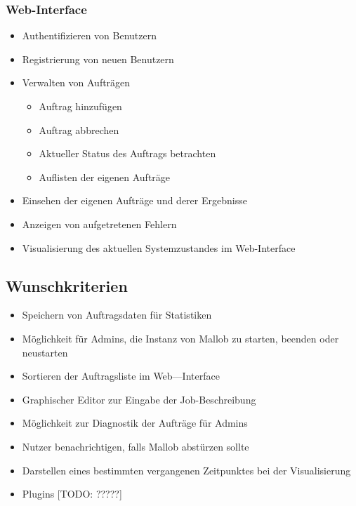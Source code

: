     \subsubsection{Web-Interface}
        \begin{itemize}
            \item Authentifizieren von Benutzern
            \item Registrierung von neuen Benutzern
            \item Verwalten von Aufträgen
                 \begin{itemize}
                    \item Auftrag hinzufügen
                    \item Auftrag abbrechen
                    \item Aktueller Status des Auftrags betrachten
                    \item Auflisten der eigenen Aufträge
                \end{itemize}
            \item Einsehen der eigenen Aufträge und derer Ergebnisse
            \item Anzeigen von aufgetretenen Fehlern
            \item Visualisierung des aktuellen Systemzustandes im Web-Interface
        \end{itemize}
        
        
\subsection{Wunschkriterien}
    \begin{itemize}
        \item Speichern von Auftragsdaten für Statistiken
        \item Möglichkeit für Admins, die Instanz von Mallob zu starten, beenden oder neustarten
        \item Sortieren der Auftragsliste im Web—Interface
        \item Graphischer Editor zur Eingabe der Job-Beschreibung
        \item Möglichkeit zur Diagnostik der Aufträge für Admins
        \item Nutzer benachrichtigen, falls Mallob abstürzen sollte
        \item Darstellen eines bestimmten vergangenen Zeitpunktes bei der Visualisierung
        \item Plugins [TODO: ?????]
    \end{itemize}
    
